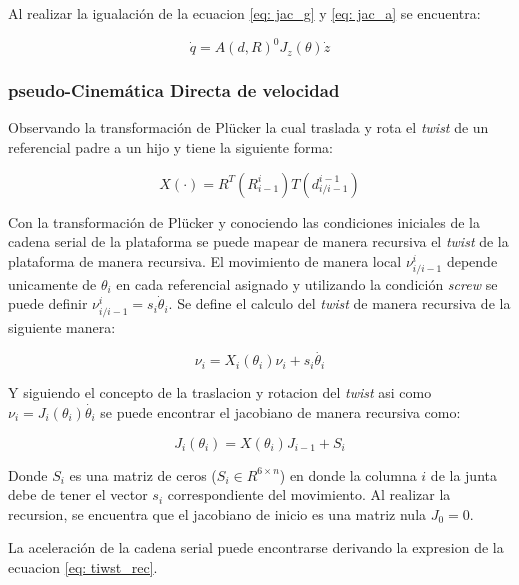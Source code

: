 Al realizar la igualación de la ecuacion \ref{eq: jac_g} y \ref{eq: jac_a} se encuentra:

\begin{equation} \label{eq: q_twist}
\dot{q} = A(d,R)^0J_z(\theta) \dot{z}
\end{equation}

\subsubsection{pseudo-Cinemática Directa de velocidad}

Observando la transformación de Plücker la cual traslada y rota el \emph{twist} de un referencial padre a un hijo y tiene la siguiente forma:

\begin{equation} \label{eq: plucker}
X(\cdot) = R^T(R_{i-1}^i)T(d_{i/i-1}^{i-1})
\end{equation}

Con la transformación de Plücker y conociendo las condiciones iniciales de la cadena serial de la plataforma se puede mapear de manera recursiva el \emph{twist} de la plataforma de manera recursiva. El movimiento de manera local $\nu_{i/i-1}^{i}$ depende unicamente de $\theta_i$ en cada referencial asignado y utilizando la condición \emph{screw} se puede definir $\nu_{i/i-1}^{i} = s_i \dot{\theta}_i$. Se define el calculo del \emph{twist} de manera recursiva de la siguiente manera:

\begin{equation} \label{eq: tiwst_rec}
\nu_i = X_i(\theta_i)\nu_i + s_i\dot{\theta_i}
\end{equation}

Y siguiendo el concepto de la traslacion y rotacion del \emph{twist} asi como $\nu_i = J_{i}(\theta_i)\dot{\theta_i}$ se puede encontrar el jacobiano de manera recursiva como:

\begin{equation}
J_i(\theta_i) = X(\theta_i) J_{i-1} + S_i
\end{equation}

Donde $S_i$ es una matriz de ceros ($S_i \in R^{6\times n}$) en donde la columna $i$ de la junta debe de tener el vector $s_i$ correspondiente del movimiento. Al realizar la recursion, se encuentra que el jacobiano de inicio es una matriz nula $J_0 = 0$.

La aceleración de la cadena serial puede encontrarse derivando la expresion de la ecuacion \ref{eq: tiwst_rec}.


